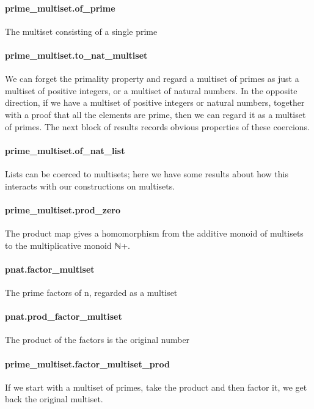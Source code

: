 \documentclass{article}
\begin{document}
\paragraph{prime\_multiset.of\_prime}
\par
The multiset consisting of a single prime
\paragraph{prime\_multiset.to\_nat\_multiset}
\par
We can forget the primality property and regard a multiset
of primes as just a multiset of positive integers, or a multiset
of natural numbers.  In the opposite direction, if we have a
multiset of positive integers or natural numbers, together with
a proof that all the elements are prime, then we can regard it
as a multiset of primes.  The next block of results records
obvious properties of these coercions.
\paragraph{prime\_multiset.of\_nat\_list}
\par
Lists can be coerced to multisets; here we have some results
about how this interacts with our constructions on multisets.
\paragraph{prime\_multiset.prod\_zero}
\par
The product map gives a homomorphism from the additive monoid
of multisets to the multiplicative monoid ℕ+.
\paragraph{pnat.factor\_multiset}
\par
The prime factors of n, regarded as a multiset
\paragraph{pnat.prod\_factor\_multiset}
\par
The product of the factors is the original number
\paragraph{prime\_multiset.factor\_multiset\_prod}
\par
If we start with a multiset of primes, take the product and
then factor it, we get back the original multiset.
\end{document}
